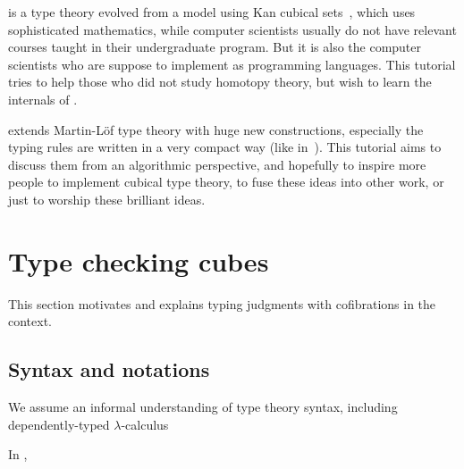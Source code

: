 \CTT{} is a type theory evolved from a model using Kan cubical sets~\cite{CubicalSets},
which uses sophisticated mathematics, while computer scientists
usually do not have relevant courses taught in their undergraduate program.
But it is also the computer scientists who are suppose to implement \CTT{} as
programming languages. This tutorial tries to help those who did not study homotopy
theory, but wish to learn the internals of \CTT.

\CTT{} extends Martin-L\"{o}f type theory with huge new constructions,
especially the typing rules are written in a very compact way (like in~\cite{HCompPDF}).
This tutorial aims to discuss them from an algorithmic perspective,
and hopefully to inspire more people to implement cubical type theory,
to fuse these ideas into other work, or just to worship these brilliant ideas.

\section{Type checking cubes}\label{sec:tyck-cube}
This section motivates and explains typing judgments with cofibrations in the context.

\subsection{Syntax and notations}\label{sub:syntax}
We assume an informal understanding of type theory syntax, including
dependently-typed $\lambda$-calculus

In \CTT, 
